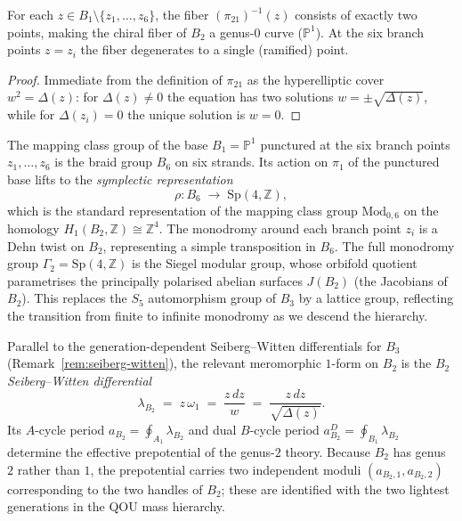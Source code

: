 \begin{proposition}
\label{prop:B2-chiral-fiber}
For each $z \in B_1\setminus\{z_1,\dots,z_6\}$, the fiber
$(\pi_{21})^{-1}(z)$ consists of exactly two points, making the chiral
fiber of $B_2$ a genus-$0$ curve ($\mathbb{P}^1$).  At the six branch
points $z = z_i$ the fiber degenerates to a single (ramified) point.
\end{proposition}
\begin{proof}
Immediate from the definition of $\pi_{21}$ as the hyperelliptic cover
$w^2=\Delta(z)$: for $\Delta(z)\neq 0$ the equation has two solutions
$w=\pm\sqrt{\Delta(z)}$, while for $\Delta(z_i)=0$ the unique solution
is $w=0$.
\end{proof}

\begin{remark}
\label{rem:B2-braid-action}
The mapping class group of the base $B_1 = \mathbb{P}^1$ punctured at
the six branch points $z_1,\dots,z_6$ is the braid group $B_6$ on six
strands.  Its action on $\pi_1$ of the punctured base lifts to the
\emph{symplectic representation}
\[
  \rho\colon B_6 \;\longrightarrow\; \mathrm{Sp}(4,\mathbb{Z}),
\]
which is the standard representation of the mapping class group
$\mathrm{Mod}_{0,6}$ on the homology $H_1(B_2,\mathbb{Z})\cong\mathbb{Z}^4$.
The monodromy around each branch point $z_i$ is a Dehn twist on $B_2$,
representing a simple transposition in $B_6$.  The full monodromy group
$\Gamma_2 = \mathrm{Sp}(4,\mathbb{Z})$ is the Siegel modular group, whose
orbifold quotient parametrises the principally polarised abelian surfaces
$J(B_2)$ (the Jacobians of $B_2$).  This replaces the $S_5$ automorphism
group of $B_3$ by a lattice group, reflecting the transition from finite
to infinite monodromy as we descend the hierarchy.
\end{remark}

\begin{remark}
\label{rem:B2-SW-differential}
Parallel to the generation-dependent Seiberg--Witten differentials for
$B_3$ (Remark~\ref{rem:seiberg-witten}), the relevant
meromorphic $1$-form on $B_2$ is the \emph{$B_2$ Seiberg--Witten
differential}
\begin{equation}\label{eq:B2-SW-diff}
  \lambda_{B_2} \;=\; z\,\omega_1 \;=\; \frac{z\,dz}{w}
  \;=\; \frac{z\,dz}{\sqrt{\Delta(z)}}.
\end{equation}
Its $A$-cycle period
$a_{B_2} = \oint_{A_1}\lambda_{B_2}$
and dual $B$-cycle period
$a_{B_2}^D = \oint_{B_1}\lambda_{B_2}$
determine the effective prepotential of the genus-$2$ theory.
Because $B_2$ has genus $2$ rather than $1$, the prepotential carries
two independent moduli $(a_{B_2,1}, a_{B_2,2})$ corresponding to the
two handles of $B_2$; these are identified with the two lightest
generations in the QOU mass hierarchy.
\end{remark}

